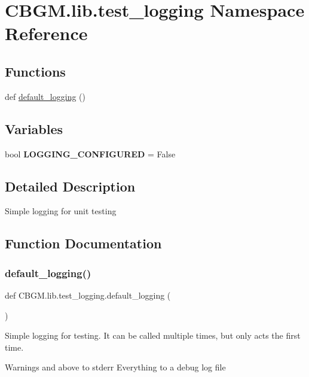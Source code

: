 \hypertarget{namespaceCBGM_1_1lib_1_1test__logging}{}\section{C\+B\+G\+M.\+lib.\+test\+\_\+logging Namespace Reference}
\label{namespaceCBGM_1_1lib_1_1test__logging}
\subsection*{Functions}
\begin{DoxyCompactItemize}
\item 
def \hyperlink{namespaceCBGM_1_1lib_1_1test__logging_a2c7a8d9369640e793b8a9083e6cce6fe}{default\+\_\+logging} ()
\end{DoxyCompactItemize}
\subsection*{Variables}
\begin{DoxyCompactItemize}
\item 
\mbox{\label{namespaceCBGM_1_1lib_1_1test__logging_a33f9a2541eb92d5b404e7c7d5b5ccb96}} 
bool {\bfseries L\+O\+G\+G\+I\+N\+G\+\_\+\+C\+O\+N\+F\+I\+G\+U\+R\+ED} = False
\end{DoxyCompactItemize}


\subsection{Detailed Description}
\begin{DoxyVerb}Simple logging for unit testing
\end{DoxyVerb}
 

\subsection{Function Documentation}
\mbox{\label{namespaceCBGM_1_1lib_1_1test__logging_a2c7a8d9369640e793b8a9083e6cce6fe}} 
\subsubsection{\texorpdfstring{default\+\_\+logging()}{default\_logging()}}
{\footnotesize\ttfamily def C\+B\+G\+M.\+lib.\+test\+\_\+logging.\+default\+\_\+logging (\begin{DoxyParamCaption}{ }\end{DoxyParamCaption})}

\begin{DoxyVerb}Simple logging for testing. It can be called multiple times, but
only acts the first time.

Warnings and above to stderr
Everything to a debug log file
\end{DoxyVerb}
 